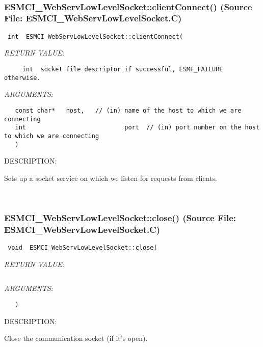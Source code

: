 \mbox{}\hrulefill\
 
\subsubsection{ESMCI\_WebServLowLevelSocket::clientConnect() (Source File: ESMCI\_WebServLowLevelSocket.C)}


  
\begin{verbatim} int  ESMCI_WebServLowLevelSocket::clientConnect(\end{verbatim}{\em RETURN VALUE:}
\begin{verbatim}     int  socket file descriptor if successful, ESMF_FAILURE otherwise.\end{verbatim}{\em ARGUMENTS:}
\begin{verbatim}   const char*   host,   // (in) name of the host to which we are connecting
   int                           port  // (in) port number on the host to which we are connecting
   )\end{verbatim}
{\sf DESCRIPTION:\\ }


      Sets up a socket service on which we listen for requests from clients.
   
 
\mbox{}\hrulefill\
 
\subsubsection{ESMCI\_WebServLowLevelSocket::close() (Source File: ESMCI\_WebServLowLevelSocket.C)}


  
\begin{verbatim} void  ESMCI_WebServLowLevelSocket::close(\end{verbatim}{\em RETURN VALUE:}
\begin{verbatim} \end{verbatim}{\em ARGUMENTS:}
\begin{verbatim}   )\end{verbatim}
{\sf DESCRIPTION:\\ }


      Close the communication socket (if it's open).
   
 
\mbox{}\hrulefill\
 
